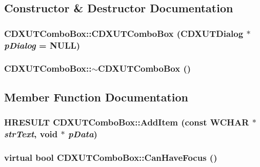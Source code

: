 \subsection{Constructor \& Destructor Documentation}
\hypertarget{class_c_d_x_u_t_combo_box_ab7f69be9c0bd5cee7b8057eb73db69c7}{
\subsubsection[{CDXUTComboBox}]{\setlength{\rightskip}{0pt plus 5cm}CDXUTComboBox::CDXUTComboBox ({\bf CDXUTDialog} $\ast$ {\em pDialog} = {\ttfamily NULL})}}
\label{class_c_d_x_u_t_combo_box_ab7f69be9c0bd5cee7b8057eb73db69c7}
\hypertarget{class_c_d_x_u_t_combo_box_ac4aa6d69b8f19e38d215ce9d749f2840}{
\subsubsection[{$\sim$CDXUTComboBox}]{\setlength{\rightskip}{0pt plus 5cm}CDXUTComboBox::$\sim$CDXUTComboBox ()}}
\label{class_c_d_x_u_t_combo_box_ac4aa6d69b8f19e38d215ce9d749f2840}


\subsection{Member Function Documentation}
\hypertarget{class_c_d_x_u_t_combo_box_aa444c95e8c96e0e16a5184de95cd3bd9}{
\subsubsection[{AddItem}]{\setlength{\rightskip}{0pt plus 5cm}HRESULT CDXUTComboBox::AddItem (const WCHAR $\ast$ {\em strText}, \/  void $\ast$ {\em pData})}}
\label{class_c_d_x_u_t_combo_box_aa444c95e8c96e0e16a5184de95cd3bd9}
\hypertarget{class_c_d_x_u_t_combo_box_a274c5f85816abf1d040ea1606bd3447c}{
\subsubsection[{CanHaveFocus}]{\setlength{\rightskip}{0pt plus 5cm}virtual bool CDXUTComboBox::CanHaveFocus ()}}
\label{class_c_d_x_u_t_combo_box_a274c5f85816abf1d040ea1606bd3447c}


